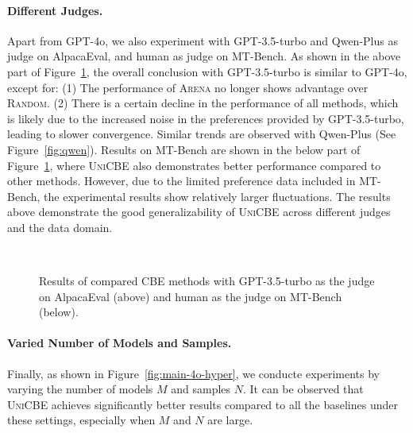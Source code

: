 \paragraph{Different Judges.} Apart from GPT-4o, we also experiment with GPT-3.5-turbo and Qwen-Plus as judge on AlpacaEval, and human as judge on MT-Bench. As shown in the above part of Figure~\ref{fig:main-diffjudge}, 
the overall conclusion with GPT-3.5-turbo is similar to GPT-4o, except for: (1) The performance of \textsc{Arena} no longer shows advantage over \textsc{Random}. (2) There is a certain decline in the performance of all methods, which is likely due to the increased noise in the preferences provided by GPT-3.5-turbo, leading to slower convergence. 
Similar trends are observed with Qwen-Plus (See Figure~\ref{fig:qwen}).
Results on MT-Bench are shown in the below part of Figure~\ref{fig:main-diffjudge}, where \textsc{UniCBE} also demonstrates better performance compared to other methods. However, due to the limited preference data included in MT-Bench, the experimental results show relatively larger fluctuations.
The results above demonstrate the good generalizability of \textsc{UniCBE} across different judges and the data domain.
\begin{figure}[h]
    \centering
    \hfill
    \hfill
     \\
    \hfill
    \hfill
    \vspace{-0.2cm}
    \caption{Results of compared CBE methods with GPT-3.5-turbo as the judge on AlpacaEval (above) and human as the judge on MT-Bench (below). }
    \vspace{-0.4cm}
    \label{fig:main-diffjudge}
\end{figure}
\paragraph{Varied Number of Models and Samples.}
Finally, as shown in Figure~\ref{fig:main-4o-hyper}, we conducte experiments by varying the number of models \(M\) and samples \(N\). It can be observed that \textsc{UniCBE} achieves significantly better results compared to all the baselines under these settings, especially when \(M\) and \(N\) are large.

